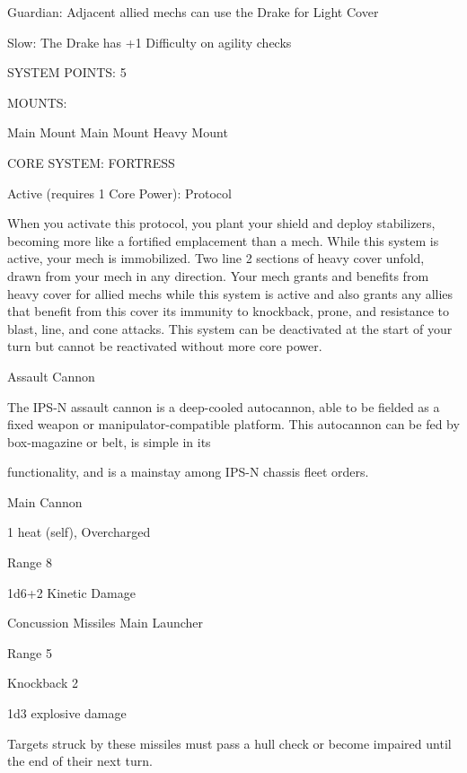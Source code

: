   Guardian: Adjacent allied mechs can use the Drake for Light Cover
 
  Slow: The Drake has +1 Difficulty on agility checks 

                                               SYSTEM POINTS: 5 

                                                    MOUNTS: 

  Main Mount                         Main Mount                              Heavy Mount 

                                          CORE SYSTEM: FORTRESS 

  Active (requires 1 Core Power):  
  Protocol
 
  When you activate this protocol, you plant your shield and deploy stabilizers, becoming more like a  
  fortified emplacement than a mech. While this system is active, your mech is immobilized. Two line 2  
  sections of heavy cover unfold, drawn from your mech in any direction. Your mech grants and benefits  
  from heavy cover for allied mechs while this system is active and also grants any allies that benefit from  
  this cover its immunity to knockback, prone, and resistance to blast, line, and cone attacks. This  
  system can be deactivated at the start of your turn but cannot be reactivated without more core power. 

Assault Cannon  

The IPS-N assault cannon is a deep-cooled autocannon, able to be fielded as a fixed weapon or  
manipulator-compatible platform. This autocannon can be fed by box-magazine or belt, is simple in its  

functionality, and is a mainstay among IPS-N chassis fleet orders.   

Main Cannon
 
1 heat (self), Overcharged
 
Range 8
 
1d6+2 Kinetic Damage
 

                                                                                                                


Concussion Missiles   
Main Launcher
 
Range 5
 
Knockback 2
 
1d3 explosive damage
 
Targets struck by these missiles must pass a hull check or become impaired until the end of their  
next turn.
 

